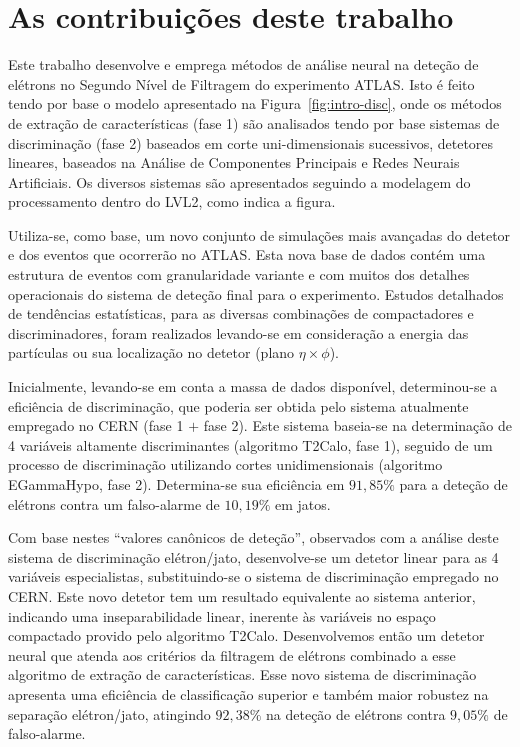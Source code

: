 \section{As contribuições deste trabalho}

Este trabalho desenvolve e emprega métodos de análise neural na deteção de
elétrons no Segundo Nível de Filtragem do experimento ATLAS. Isto é feito
tendo por base o modelo apresentado na Figura~\ref{fig:intro-disc}, onde os
métodos de extração de características (fase 1) são analisados tendo por base
sistemas de discriminação (fase 2) baseados em corte uni-dimensionais
sucessivos, detetores lineares, baseados na Análise de Componentes Principais
e Redes Neurais Artificiais. Os diversos sistemas são apresentados seguindo a
modelagem do processamento dentro do LVL2, como indica a figura.

Utiliza-se, como base, um novo conjunto de simulações mais avançadas do
detetor e dos eventos que ocorrerão no ATLAS. Esta nova base de dados contém
uma estrutura de eventos com granularidade variante e com muitos dos detalhes
operacionais do sistema de deteção final para o experimento. Estudos
detalhados de tendências estatísticas, para as diversas combinações de
compactadores e discriminadores, foram realizados levando-se em consideração a
energia das partículas ou sua localização no detetor (plano $\eta\times\phi$).

Inicialmente, levando-se em conta a massa de dados disponível, determinou-se a
eficiência de discriminação, que poderia ser obtida pelo sistema atualmente
empregado no CERN (fase 1 $+$ fase 2). Este sistema baseia-se na determinação
de 4 variáveis altamente discriminantes (algoritmo T2Calo, fase 1), seguido de
um processo de discriminação utilizando cortes unidimensionais (algoritmo
EGammaHypo, fase 2). Determina-se sua eficiência em $91,85\%$ para a deteção
de elétrons contra um falso-alarme de $10,19\%$ em jatos.

Com base nestes ``valores canônicos de deteção'', observados com a análise
deste sistema de discriminação elétron/jato, desenvolve-se um detetor linear
para as 4 variáveis especialistas, substituindo-se o sistema de discriminação
 empregado no CERN. Este novo detetor tem um resultado
equivalente ao sistema anterior, indicando uma inseparabilidade linear,
inerente às variáveis no espaço compactado provido pelo algoritmo
T2Calo. Desenvolvemos então um detetor neural que atenda aos critérios da
filtragem de elétrons combinado a esse algoritmo de extração de
características. Esse novo sistema de discriminação apresenta uma eficiência
de classificação superior e também maior robustez na separação elétron/jato,
atingindo $92,38\%$ na deteção de elétrons contra $9,05\%$ de falso-alarme.

